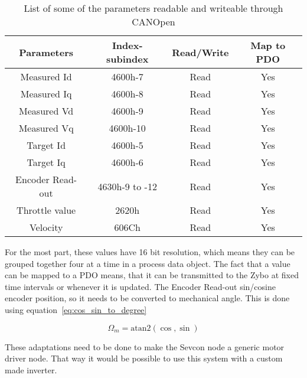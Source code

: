 \begin{table}[h]
	\centering
	\begin{tabular}{| c | c | c | c |}
		\hline
		Parameters & Index-subindex & Read/Write & Map to PDO \\ %
		\hline
		Measured Id & 4600h-7 & Read & Yes \\ %
		Measured Iq & 4600h-8 & Read & Yes \\ %
		Measured Vd & 4600h-9 & Read & Yes \\ %
		Measured Vq & 4600h-10 & Read & Yes \\ %
		Target Id & 4600h-5 & Read & Yes \\ %
		Target Iq & 4600h-6 & Read & Yes \\ %
		Encoder Read-out & 4630h-9 to -12 & Read & Yes \\ %
		Throttle value & 2620h & Read & Yes \\ %
		Velocity & 606Ch & Read & Yes \\ %
		\hline	
	\end{tabular}
	\caption{List of some of the parameters readable and writeable through CANOpen}
	\label{tab:parameters_of_interest}
\end{table}

For the most part, these values have 16 bit resolution, which means they can be grouped together four at a time in a process data object.
The fact that a value can be mapped to a PDO means, that it can be transmitted to the Zybo at fixed time intervals or whenever it is updated.
The Encoder Read-out sin/cosine encoder position, so it needs to be converted to mechanical angle. 
This is done using equation~\ref{eq:cos_sin_to_degree}

\begin{equation}
\Omega_m = \mathrm{atan2}(\cos,\sin)
\label{eq:cos_sin_to_degree}
\end{equation}

These adaptations need to be done to make the Sevcon node a generic motor driver node.
That way it would be possible to use this system with a custom made inverter.
